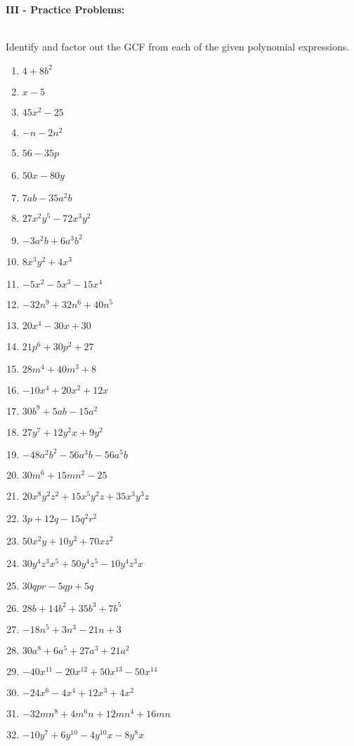\documentclass[12pt]{article}
\theoremstyle{definition}
\begin{document}
{\bf III - Practice Problems:}\\
\ \par
Identify and factor out the GCF from each of the given polynomial expressions.
\begin{multicols}{3}
	\begin{enumerate}
	\item $4 + 8 b^2$
  \item $x - 5$
  \item $45 x^2 - 25$
  \item $-n - 2 n^2$
  \item $56 - 35 p$
  \item $50 x - 80 y$
  \item $7 ab - 35 a^2 b$
  \item $27 x^2 y^5 - 72 x^3 y^2$
  \item $- 3 a^2 b + 6 a^3 b^2$
  \item $8 x^3 y^2 + 4 x^3$
  \item $- 5 x^2 - 5 x^3 - 15 x^4$
  \item $- 32 n^9 + 32 n^6 + 40 n^5$
  \item $20 x^4 - 30 x + 30$
  \item $21 p^6 + 30 p^2 + 27$
  \item $28 m^4 + 40 m^3 + 8$
  \item $- 10 x^4 + 20 x^2 + 12 x$
  \item $30 b^9 + 5 a b - 15 a^2$
  \item $27 y^7 + 12 y^2 x + 9 y^2$
\end{enumerate}
 \end{multicols}
\begin{multicols}{2}
	\begin{enumerate}
\setcounter{enumi}{18}
  \item $- 48 a^2 b^2 - 56 a^3 b - 56 a^5 b$
  \item $30 m^6 + 15 m n^2 - 25$
  \item $20 x^8 y^2 z^2 + 15 x^5 y^2 z + 35 x^3 y^3 z$
  \item $3 p + 12 q - 15 q^2 r^2$
  \item $50 x^2 y + 10 y^2 + 70 x z^2$
  \item $30 y^4 z^3 x^5 + 50 y^4 z^5 - 10 y^4 z^3 x$
  \item $30 q p r - 5 q p + 5 q$
  \item $28 b + 14 b^2 + 35 b^3 + 7 b^5$
  \item $- 18 n^5 + 3 n^3 - 21 n + 3$
  \item $30 a^8 + 6 a^5 + 27 a^3 + 21 a^2$
  \item $- 40 x^{11} - 20 x^{12} + 50 x^{13} - 50 x^{14}$
  \item $- 24 x^6 - 4 x^4 + 12 x^3 + 4 x^2$
  \item $- 32 m n^8 + 4 m^6 n + 12 m n^4 + 16 m n$
  \item $- 10 y^7 + 6 y^{10} - 4 y^{10} x - 8 y^8 x$
\end{enumerate}
\end{multicols}
\newpage
\end{document}
